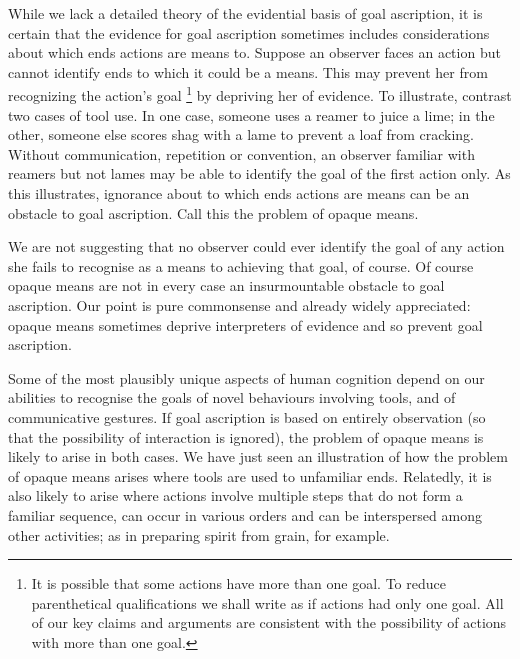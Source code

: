 \documentclass[14pt,a4paper]{extarticle}
\begin{document}
While we lack a detailed theory of the evidential basis of goal ascription,
it is certain that the evidence for goal ascription sometimes includes considerations about which ends actions are means to.
Suppose an observer faces an action but cannot identify ends to which it could be a means.
This may prevent her from recognizing the action's goal%
\footnote{
It is possible that some actions have more than one goal.
To reduce parenthetical qualifications we shall write as if actions had only one goal.  
All of our key claims and arguments are consistent with the possibility of actions with more than one goal.
} 
 by depriving her of evidence.
To illustrate, contrast two cases of tool use.
In one case, someone uses a reamer to  juice  a lime; in the other, someone else scores shag with a lame to prevent a loaf from cracking.
Without communication, repetition or convention,
an observer familiar with reamers but not lames 
may be able to identify the goal of the first action only.
As this illustrates, ignorance about to which ends actions are means can be an obstacle to goal ascription.%
Call this the problem of opaque means.

We are not suggesting that no observer could ever identify the goal of any action she fails to recognise as a means to achieving that goal, of course.
Of course opaque means are not in every case an insurmountable obstacle to goal ascription.
Our point is pure commonsense and already widely appreciated:
opaque means sometimes  deprive interpreters of evidence and so prevent goal ascription.

Some of the most plausibly unique aspects of human cognition depend on our abilities to recognise the goals of novel behaviours involving tools, and of communicative gestures.
If goal ascription is based on entirely observation 
(so that the possibility of interaction is ignored),
the problem of opaque means is likely to arise in both cases.
We have just seen an illustration of how the problem of opaque means arises where tools are used to unfamiliar ends.
Relatedly, it is also likely to arise where actions involve multiple steps that do not form a familiar sequence, can occur in various orders and can be interspersed among other activities;
as in preparing spirit from grain, for example.
\end{document}
